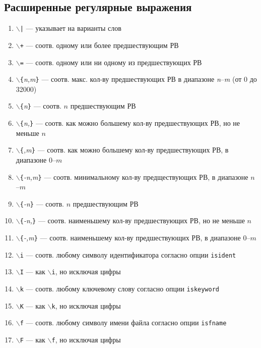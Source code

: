 \documentclass[a4paper,10pt, twocolumn]{article}
\newcommand*{\cod}[1]{\texttt{#1}}
\begin{document}
\subsection{Расширенные регулярные выражения}
\begin{enumerate}
    \item \cod{$\backslash$|} --- указывает на варианты слов
    \item \cod{$\backslash$+} --- соотв. одному или более предшествующим РВ
    \item \cod{$\backslash$=} --- соотв. одному или ни одному из предшествующих РВ
    \item \cod{$\backslash$\{}\textit{n,m}\cod{\}} --- соотв. макс. кол-ву предшествующих РВ в диапазоне \textit{n}--\textit{m} (от 0 до 32000)
    \item \cod{$\backslash$\{}\textit{n}\cod{\}} --- соотв. $n$ предшествующим РВ
    \item \cod{$\backslash$\{}\textit{n,}\cod{\}} --- соотв. как можно большему кол-ву предшествующих РВ, но не меньше $n$
    \item \cod{$\backslash$\{}\textit{,m}\cod{\}} --- соотв. как можно большему кол-ву предшествующих РВ, в диапазоне $0$--$m$
    \item \cod{$\backslash$\{}\textit{-n,m}\cod{\}} --- соотв. минимальному кол-ву предществующих РВ, в диапазоне $n$--$m$ 
    \item \cod{$\backslash$\{}\textit{-n}\cod{\}} --- соотв. $n$ предшествующим РВ
    \item \cod{$\backslash$\{}\textit{-n,}\cod{\}} --- соотв. наименьшему кол-ву предшествующих РВ, но не меньше $n$
    \item \cod{$\backslash$\{}\textit{-,m}\cod{\}} --- соотв. наименьшему кол-ву предшествующих РВ, в диапазоне $0$--$m$ 
    \item \cod{$\backslash$i} --- соотв. любому символу идентификатора согласно опции \cod{isident}
    \item \cod{$\backslash$I} --- как \cod{$\backslash$i}, но исключая цифры
    \item \cod{$\backslash$k} --- соотв. любому ключевому слову согласно опции \cod{iskeyword}
    \item \cod{$\backslash$K} --- как \cod{$\backslash$k}, но исключая цифры
    \item \cod{$\backslash$f} --- соотв. любому символу имени файла согласно опции \cod{isfname}
    \item \cod{$\backslash$F} --- как \cod{$\backslash$f}, но исключая цифры

\end{enumerate}
\end{document}
